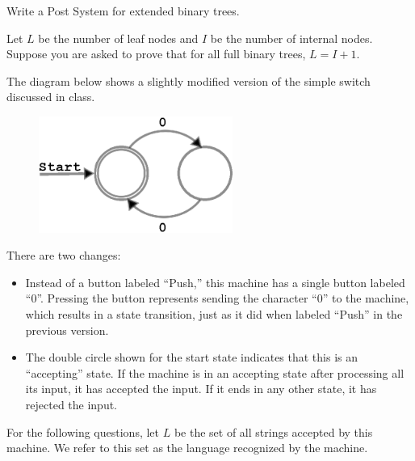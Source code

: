 \documentclass[]{exam}
\theoremstyle{definition}
\begin{document}
\begin{questions}
\question Write a Post System for extended binary trees.

\question Let $L$ be the number of leaf nodes and $I$ be the number
          of internal nodes. Suppose you are asked to prove that for all 
          full binary trees, $L = I + 1$.
\question The diagram below shows a slightly modified version of the simple
switch discussed in class. \\
\begin{figure}[h]
\centering
\includegraphics[width=2.5in, height=.75in,keepaspectratio=true]{evenzeroautomata.eps}
\label{2sp}
\end{figure}

There are two changes:
\begin{itemize}
\item Instead of a button labeled ``Push,'' this machine has a single button
labeled ``0''. Pressing the button represents sending the character ``0''
to the machine, which results in a state transition, just as it did when labeled
``Push'' in the previous version.
\item The double circle shown for the start state indicates that this is an
``accepting'' state. If the machine is in an accepting state after processing
all its input, it has accepted the input. If it ends in any other state, it has
rejected the input.
\end{itemize}
For the following questions, let $L$ be the set of all strings accepted by this machine. 
We refer to this set as the language recognized by the machine.


\end{questions}
\end{document}
